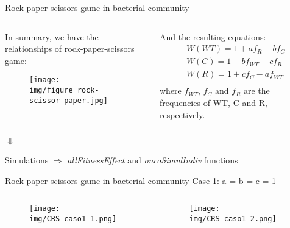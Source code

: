 \begin{frame}{Rock-paper-scissors game in bacterial community}
	\begin{columns}
		\begin{column}{0.5\textwidth}
			\begin{center}
				In summary, we have the relationships of rock-paper-scissors game:
			\end{center}
			\begin{figure}
				\texttt{[image: img/figure\_rock-scissor-paper.jpg]}			
			\end{figure}
		\end{column}
		\begin{column}{0.5\textwidth}
			\begin{center}
				And the resulting equations:
			\begin{align*}
				W\left(WT\right) = 1 + af_R - bf_C\\
				W\left(C\right) = 1 + bf_{WT} - cf_R\\
				W\left(R\right) = 1 + cf_C - af_{WT}\\
			\end{align*}
			where $f_{WT}$, $f_C$ and $f_R$ are the frequencies of WT, C and R, respectively. 
			\end{center}
		\end{column}
	\end{columns}
	\pause
	\begin{center}
		{\LARGE $\Downarrow$\\}
		\begin{block}
			{\centering
				Simulations $\Longrightarrow$ \textit{allFitnessEffect} and \textit{oncoSimulIndiv} functions
			}
		\end{block}
	\end{center}	
\end{frame}


\begin{frame}{Rock-paper-scissors game in bacterial community}
Case 1: a = b = c = 1
	\begin{columns}
		\begin{column}{0.5\textwidth}
			\begin{figure}
				\texttt{[image: img/CRS\_caso1\_1.png]}			
			\end{figure}
		\end{column}

		\begin{column}{0.5\textwidth}
			\begin{figure}
				\texttt{[image: img/CRS\_caso1\_2.png]}			
			\end{figure}
		\end{column}
	\end{columns}
\end{frame}

